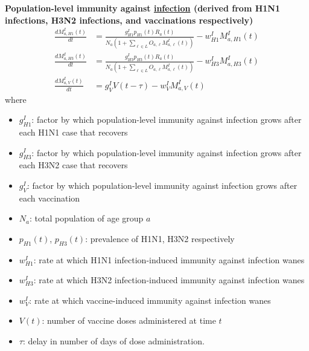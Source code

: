 \documentclass[11pt]{article}
\begin{document}
\textbf{Population-level immunity against \underline{infection} (derived from H1N1 infections, H3N2 infections, and vaccinations respectively)}
\begin{align}
    \frac{dM^I_{a,H1}(t)}{dt} &= \frac{g^I_{H1} p_{H1}(t) R_a(t)}{N_a \left(1 + \sum_{\ell \in L} O_{a, \ell} M^I_{a, \ell}(t)\right)} - w^I_{H1} M^I_{a, H1}(t) \\
    \frac{dM^I_{a,H3}(t)}{dt} &= \frac{g^I_{H3} p_{H3}(t) R_a(t)}{N_a \left(1 + \sum_{\ell \in L} O_{a, \ell} M^I_{a, \ell}(t)\right)} - w^I_{H3} M^I_{a, H3}(t) \\
    \frac{dM^I_{a,V}(t)}{dt} &= g^I_V V(t - \tau) - w^I_V M^I_{a, V}(t)
\end{align}
where
\begin{itemize}
    \item $g^I_{H1}$: factor by which population-level immunity against infection grows after each H1N1 case that recovers
    \item $g^I_{H3}$: factor by which population-level immunity against infection grows after each H3N2 case that recovers
    \item $g^I_V$: factor by which population-level immunity against infection grows after each vaccination
    \item $N_a$: total population of age group $a$
    \item $p_{H1}(t)$, $p_{H3}(t)$: prevalence of H1N1, H3N2 respectively
    \item $w^I_{H1}$: rate at which H1N1 infection-induced immunity against infection wanes
    \item $w^I_{H3}$: rate at which H3N2 infection-induced immunity against infection wanes
    \item $w^I_V$: rate at which vaccine-induced immunity against infection wanes
    \item $V(t)$: number of vaccine doses administered at time $t$
    \item $\tau$: delay in number of days of dose administration. \newline
\end{itemize}
\end{document}
